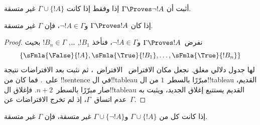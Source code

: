 \documentclass[../../../include/open-logic-section]{subfiles}
\begin{document}
\begin{prob}
أثبت أن $\Gamma \Proves \lnot !A$ إذا وفقط إذا كانت $\Gamma \cup \{!A\}$ غير متسقة.
\end{prob}

\begin{prop}
  إذا كان $\Gamma \Proves !A$ و$\lnot !A \in \Gamma$، فإن $\Gamma$
  غير متسقة.
\end{prop}

\begin{proof}
  نفرض~$\Gamma \Proves !A$ و$\lnot !A \in \Gamma$، فنأخذ
  $!B_1$, \dots, $!B_n \in \Gamma$ بحيث
  \[
  \{\sFmla{\False}{!A}, \sFmla{\True}{!B_1}, \dots, \sFmla{\True}{!B_n}\}
  \]
  لها جدول دلالي مغلق. نجعل مكان الافتراض~
  الافتراض~، ثم نثبت بعد الافتراضات نتيجة
  \TRule{\True}{\lnot} على~.
  فما كان من !!{sentence} في ال!!{tableau} مبرّرًا بالسطر~$1$
  من ال!!{tableau} القديم، صار مبرّرًا بالسطر~$n+2$.
  فإغلاق ال!!{tableau} القديم يستتبع إغلاق الجديد، ويثبت به عدم
  اتساق~$\Gamma$، إذ لم تخرج الافتراضات عن~$\Gamma$.
\end{proof}

\begin{prop}
  إذا كانت كل من $\Gamma \cup \{!A\}$ و$\Gamma \cup \{\lnot !A\}$
  غير متسقة، فإن $\Gamma$ غير متسقة.
\end{prop}
\end{document}
